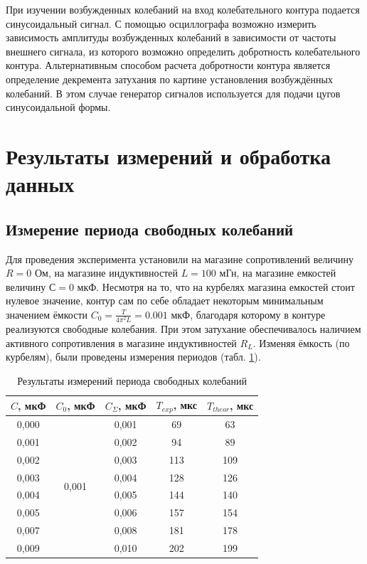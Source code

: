 \documentclass[a4paper, 12pt]{article}
\begin{document}
    При изучении возбужденных колебаний на вход колебательного контура подается синусоидальный сигнал. С помощью осциллографа возможно измерить зависимость амплитуды возбужденных колебаний в зависимости от частоты внешнего сигнала, из которого возможно определить добротность колебательного контура. Альтернативным способом расчета добротности контура является определение декремента затухания по картине установления возбуждённых колебаний. В этом случае генератор сигналов используется для подачи цугов синусоидальной формы.

    \section{Результаты измерений и обработка данных}

    \subsection{Измерение периода свободных колебаний}

    Для проведения эксперимента установили на магазине сопротивлений величину $R = 0$ Ом, на магазине индуктивностей $L = 100$ мГн, на магазине емкостей величину $С = 0$ мкФ. Несмотря на то, что на курбелях магазина емкостей стоит нулевое значение, контур сам по себе обладает некоторым минимальным значением ёмкости $C_0 = \frac{T}{4 \pi^2 L} = 0.001$ мкФ, благодаря которому в контуре реализуются свободные колебания. При этом затухание обеспечивалось наличием активного сопротивления в магазине индуктивностей $R_L$. Изменяя ёмкость (по курбелям), были проведены измерения периодов (табл. \ref{table:2.2.5}).
  
    \begin{table}[H]
        \centering
        \begin{tabular}{|c|c|c|c|c|}
        \hline
        $C$, мкФ & $C_0$, мкФ & $C_\Sigma$, мкФ & $T_{exp}$, мкс & $T_{theor}$, мкс \\ \hline
        0,000 & \multirow{8}{*}{0,001} & 0,001 & 69 & 63 \\ \cline{1-1} \cline{3-5} 
        0,001 &  & 0,002 & 94 & 89 \\ \cline{1-1} \cline{3-5} 
        0,002 &  & 0,003 & 113 & 109 \\ \cline{1-1} \cline{3-5} 
        0,003 &  & 0,004 & 128 & 126 \\ \cline{1-1} \cline{3-5} 
        0,004 &  & 0,005 & 144 & 140 \\ \cline{1-1} \cline{3-5} 
        0,005 &  & 0,006 & 157 & 154 \\ \cline{1-1} \cline{3-5} 
        0,007 &  & 0,008 & 181 & 178 \\ \cline{1-1} \cline{3-5} 
        0,009 &  & 0,010 & 202 & 199 \\ \hline
        \end{tabular}
        \caption{Результаты измерений периода свободных колебаний}
        \label{table:2.2.5}
    \end{table}
\end{document}
